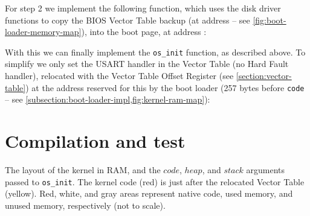 
For step 2 we implement the following function, which uses the disk driver
functions to copy the BIOS Vector Table backup (at address
 -- see \cref{fig:boot-loader-memory-map}),
into the boot page, at address :


With this we can finally implement the {\tt os\_init} function, as described
above. To simplify we only set the USART handler in the Vector Table (no Hard
Fault handler), relocated with the Vector Table Offset Register (see
\cref{section:vector-table}) at the address reserved for this by the boot loader
(257 bytes before {\tt code} -- see
\cref{subsection:boot-loader-impl,fig:kernel-ram-map}):


\section{Compilation and test}

\begin{Figure}
  

  \caption{The layout of the kernel in RAM, and the $\mathit{code}$,
  $\mathit{heap}$, and $\mathit{stack}$ arguments passed to {\tt os\_init}. The
  kernel code (red) is just after the relocated Vector Table (yellow). Red,
  white, and gray areas represent native code, used memory, and unused memory,
  respectively (not to scale).}\label{fig:kernel-ram-map}
\end{Figure}

